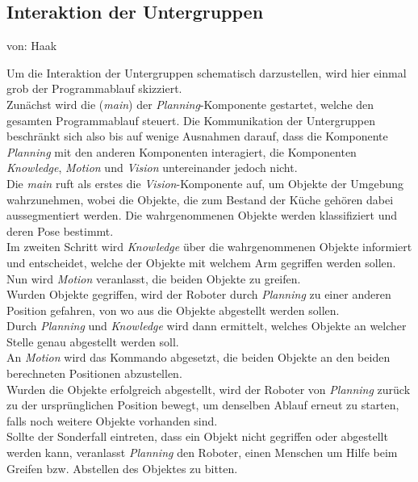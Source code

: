 \documentclass{suturo}
\makeatletter
\newcommand{\chapterauthor}[1]{%
  {\parindent0pt\vspace*{-27pt}%
  \linespread{0}\small\begin{flushright}von: #1\end{flushright}%
  \par\nobreak\vspace*{0pt}}
  \@afterheading%
}
\makeatother
\begin{document}
\subsection{Interaktion der Untergruppen}
\chapterauthor{Haak}
Um die Interaktion der Untergruppen schematisch darzustellen, wird hier einmal grob der Programmablauf skizziert.\\

Zunächst wird die (\textit{main}) der \textit{Planning}-Komponente gestartet, welche den gesamten Programmablauf steuert. Die Kommunikation der Untergruppen beschränkt sich also bis auf wenige Ausnahmen darauf, dass die Komponente \textit{Planning} mit den anderen Komponenten interagiert, die Komponenten \textit{Knowledge}, \textit{Motion} und \textit{Vision} untereinander jedoch nicht.\\

Die \textit{main} ruft als erstes die \textit{Vision}-Komponente auf, um Objekte
der Umgebung wahrzunehmen, wobei die Objekte, die zum Bestand der Küche gehören dabei aussegmentiert werden. Die wahrgenommenen Objekte werden
klassifiziert und deren Pose bestimmt. \\
Im zweiten Schritt wird \textit{Knowledge} über die wahrgenommenen Objekte informiert und entscheidet, welche der Objekte mit welchem Arm gegriffen werden sollen.\\
Nun wird \textit{Motion} veranlasst, die beiden Objekte zu greifen.\\
Wurden Objekte gegriffen, wird der Roboter durch \textit{Planning} zu einer anderen Position gefahren, von wo aus die Objekte abgestellt werden sollen.\\
Durch \textit{Planning} und \textit{Knowledge} wird dann ermittelt, welches Objekte an welcher Stelle genau abgestellt werden soll.\\
An \textit{Motion} wird das Kommando abgesetzt, die beiden Objekte an den beiden berechneten Positionen abzustellen.\\
Wurden die Objekte erfolgreich abgestellt, wird der Roboter von \textit{Planning} zurück zu der ursprünglichen Position bewegt, um denselben Ablauf erneut
zu starten, falls noch weitere Objekte vorhanden sind.\\
Sollte der Sonderfall eintreten, dass ein Objekt nicht gegriffen oder abgestellt werden kann, veranlasst \textit{Planning} den Roboter, einen Menschen um
Hilfe beim Greifen bzw. Abstellen des Objektes zu bitten.\\
\end{document}

